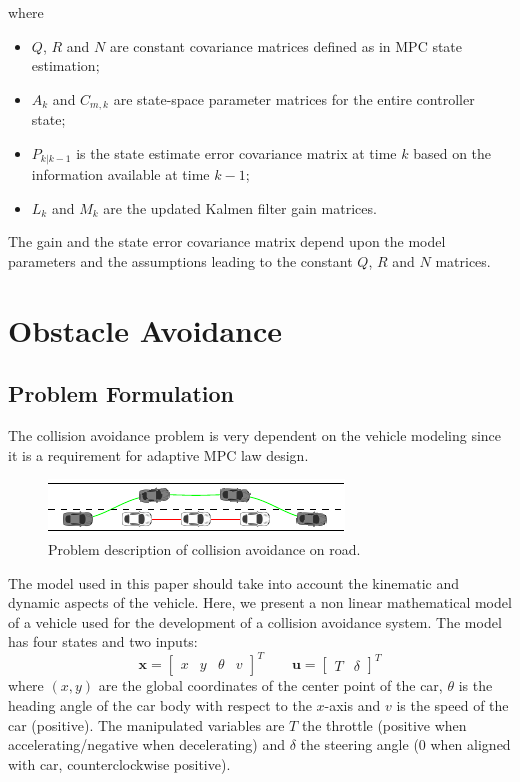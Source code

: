 \documentclass[conference, 11pt]{IEEEtran}
\begin{document}
where 
\begin{itemize}
 \item $Q$, $R$ and $N$ are constant covariance matrices defined as in MPC state estimation;
 \item $A_k$ and $C_{m,k}$ are state-space parameter matrices for the entire controller state;
 \item $P_{k|k-1}$ is the state estimate error covariance matrix at time $k$ based on the information available at time $k-1$;
 \item $L_k$ and $M_k$ are the updated Kalmen filter gain matrices.
\end{itemize}
The gain and the state error covariance matrix depend upon the model parameters
and the assumptions leading to the constant $Q$, $R$ and $N$ matrices.


\section{Obstacle Avoidance}
\subsection{Problem Formulation}
The collision avoidance problem is very dependent on the vehicle modeling since it is a requirement for  adaptive MPC law design. 
\begin{figure}[!h]
	\centering
	\includegraphics[width=1\columnwidth]{./figure/obstacleAvoidance/obstacleAvoidance.pdf}
	\caption{Problem description of collision avoidance on road.}
	\label{fig:obstacleAvoidance}
\end{figure}

The model used in this paper should take into account the kinematic and dynamic aspects of the vehicle. Here, we present a non linear mathematical model of a vehicle used for the development of a collision avoidance system.
The model has four states and two inputs:
\[ 
\textbf{x}=\begin{bmatrix}
   x&y&\theta&v 
  \end{bmatrix}^{T}
\qquad 
\textbf{u}=\begin{bmatrix}
T&\delta 
\end{bmatrix}^{T}
\]
where $(x,y)$ are the global coordinates of the center point of the car, $\theta$ is the heading angle of the car body with respect to the $x$-axis and $v$ is the speed of the car (positive). The manipulated variables are $T$ the throttle (positive when accelerating/negative when decelerating) and $\delta$ the steering angle ($0$ when aligned with car, counterclockwise positive).
\end{document}
